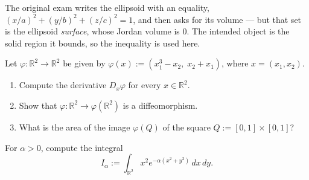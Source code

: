\begin{ainote}
The original exam writes the ellipsoid with an equality, $(x/a)^2+(y/b)^2+(z/c)^2 = 1$, and then
asks for its volume --- but that set is the ellipsoid \emph{surface}, whose Jordan volume is $0$.
The intended object is the solid region it bounds, so the inequality is used here.
\end{ainote}

\begin{exercise}
\label{ex:cubic_shear_area}
Let $\varphi : \mathbb{R}^2 \to \mathbb{R}^2$ be given by $\varphi(x) := (x_1^3 - x_2,\; x_2 + x_1)$,
where $x = (x_1,x_2)$.
\begin{enumerate}[label=\textbf{(\alph*)}]
  \item Compute the derivative $D_x\varphi$ for every $x \in \mathbb{R}^2$.
  \item Show that $\varphi : \mathbb{R}^2 \to \varphi(\mathbb{R}^2)$ is a diffeomorphism.
  \item What is the area of the image $\varphi(Q)$ of the square $Q := [0,1] \times [0,1]$?
\end{enumerate}
\end{exercise}

\begin{exercise}
\label{ex:gaussian_second_moment_polar}
For $\alpha > 0$, compute the integral
\[I_\alpha := \int_{\mathbb{R}^2} x^2 e^{-\alpha(x^2+y^2)} \, dx\,dy .\]
\end{exercise}

